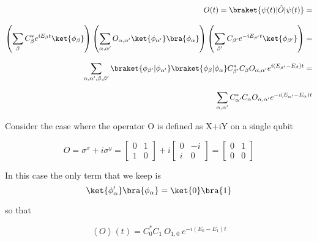\begin{equation*}
    \begin{aligned}
        O(t) =\braket{\psi(t)|\hat{O}|\psi(t)} = \\[2.0ex]
        \left( \sum_{\beta} C^{*}_{\beta} e^{i E_{\beta} t} \ket{\phi_{\beta}} \right)
        \left( \sum_{\alpha,\alpha^{\prime}} O_{\alpha,\alpha^{\prime}} \ket{\phi_{\alpha^{\prime}}} \bra{\phi_{\alpha}} \right)
        \left( \sum_{\beta^{\prime}} C_{\beta^{\prime}} e^{- i E_{\beta^{\prime}} t} \ket{\phi_{\beta^{\prime}}} \right) = \\[2.0ex]
        \sum_{\alpha, \alpha^{\prime}, \beta, \beta^{\prime} }
        \braket{\phi_{\beta^{\prime}}|\phi_{\alpha^{\prime}}}
        \braket{\phi_{\beta}|\phi_{\alpha}}
        C_{\beta^{\prime}}^{*} C_{\beta} O_{\alpha, \alpha^{\prime}} e^{i (E_{\beta^\prime} - E_{\beta}) t} = \\[2.0ex]
        \sum_{\alpha, \alpha^{\prime}} C^{*}_{\alpha^{\prime}} C_{\alpha} O_{\alpha, \alpha^{\prime}} e^{- i (E_{\alpha^{\prime}} - E_{\alpha}) t}
    \end{aligned}
\end{equation*}

Consider the case where the operator O is defined as X+iY on a single qubit

\begin{equation}
    O = \sigma^{x} + i \sigma^{y} =
    \begin{bmatrix}
        0 & 1 \\
        1 & 0
    \end{bmatrix}
    +
    i
    \begin{bmatrix}
        0 & -i \\
        i & 0
    \end{bmatrix}
    =
    \begin{bmatrix}
        0 & 1 \\
        0 & 0
    \end{bmatrix}
\end{equation}

In this case the only term that we keep is
\begin{equation}
    \ket{\phi_{\alpha}^{\prime}}
    \bra{\phi_{\alpha}}=
    \ket{0}
    \bra{1}
\end{equation}

so that

\begin{equation}
    \left< O \right>(t) = C^{*}_{0}C_{1} \: O_{1,0} \: e^{- i(E_{0} - E_{1} )t}
\end{equation}

